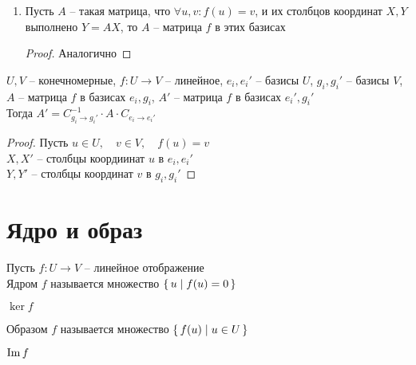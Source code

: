\begin{lemma}
\begin{enumerate}
\begin{proof}
$$            \begin{pmatrix}
            	x_1 \\
                . \\
                . \\
                . \\
                x_n
            \end{pmatrix} =
            \begin{pmatrix}
                a_{11} + ... + a_{1n}x_n \\
                \widedots[7em] \\
                a_{mi}x_1 + ... + a_{mn}x_n
            \end{pmatrix} $$
        \end{proof}
        \item Пусть $ A $ -- такая матрица, что $ \forall u, v : f(u) = v $, и их столбцов координат $ X, Y $ выполнено $ Y = AX $, то $ A $ -- матрица $ f $ в этих базисах
        \begin{proof}
        	Аналогично
        \end{proof}
    \end{enumerate}
\end{lemma}

\begin{theorem}
	$ U, V $ -- конечномерные, $ f : U \to V $ -- линейное, $ e_i, e_i' $ -- базисы $ U $, $ g_i, g_i' $ -- базисы $ V $, $A$ -- матрица $f$ в базисах $ e_i, g_i $, $ A' $ -- матрица $ f $ в базисах $ e_i', g_i' $ \\
    Тогда $ A' = C_{g_i \to g_i'}^{-1} \cdot A \cdot C_{e_i \to e_i'} $
\end{theorem}

\begin{proof}
	Пусть $ u \in U, \quad v \in V, \quad f(u) = v $ \\
    $ X, X' $ -- столбцы коордиинат $ u $ в $ e_i, e_i' $ \\
    $ Y, Y' $ -- столбцы координат $ v $ в $ g_i, g_i' $
\end{proof}

\section{Ядро и образ}

\begin{definition}
	Пусть $ f : U \to V $ -- линейное отображение \\
    Ядром $ f $ называется множество $ \set{u | f(u) = 0 } $
    \begin{notation}
    	$ \ker f $
    \end{notation}
    Образом $ f $ называется множество $ \set{f(u) | u \in U} $
    \begin{notation}
    	$ \operatorname{Im} f $
    \end{notation}
\end{definition}

